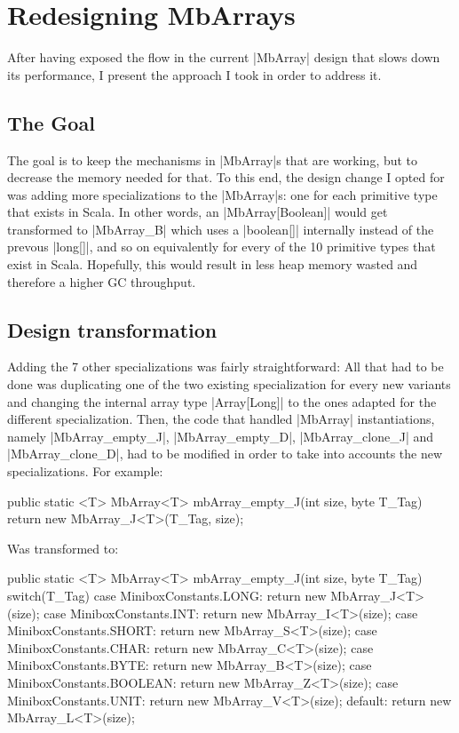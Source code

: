 \section{Redesigning MbArrays}
\label{sec:redesign}

After having exposed the flow in the current |MbArray| design that slows down its performance, I present the approach I took in order to address it.

\subsection{The Goal}

The goal is to keep the mechanisms in |MbArray|s that are working, but to decrease the memory needed for that.
To this end, the design change I opted for was adding more specializations to the |MbArray|s: one for each primitive type that exists in Scala. In other words, an |MbArray[Boolean]| would get transformed to |MbArray_B| which uses a |boolean[]| internally instead of the prevous |long[]|, and so on equivalently for every of the 10 primitive types that exist in Scala. Hopefully, this would result in less heap memory wasted and therefore a higher GC throughput.



\subsection{Design transformation}

Adding the 7 other specializations was fairly straightforward: All that had to be done was duplicating one of the two existing specialization for every new variants and changing the internal array type |Array[Long]| to the ones adapted for the different specialization.
Then, the code that handled |MbArray| instantiations, namely |MbArray_empty_J|, |MbArray_empty_D|, |MbArray_clone_J| and |MbArray_clone_D|, had to be modified in order to take into accounts the new specializations.
For example:

\begin{lstlisting-nobreak-java}
public static <T> MbArray<T> mbArray_empty_J(int size, byte T_Tag) {
  return new MbArray_J<T>(T_Tag, size);
}
\end{lstlisting-nobreak-java}

Was transformed to:

\begin{lstlisting-nobreak-java}
public static <T> MbArray<T> mbArray_empty_J(int size, byte T_Tag) {
  switch(T_Tag) {
  case MiniboxConstants.LONG:
    return new MbArray_J<T>(size);
  case MiniboxConstants.INT:
    return new MbArray_I<T>(size);
  case MiniboxConstants.SHORT:
    return new MbArray_S<T>(size);
  case MiniboxConstants.CHAR:
    return new MbArray_C<T>(size);
  case MiniboxConstants.BYTE:
    return new MbArray_B<T>(size);
  case MiniboxConstants.BOOLEAN:
    return new MbArray_Z<T>(size);
  case MiniboxConstants.UNIT:
    return new MbArray_V<T>(size);
  default:
    return new MbArray_L<T>(size);
  }
}
\end{lstlisting-nobreak-java}

